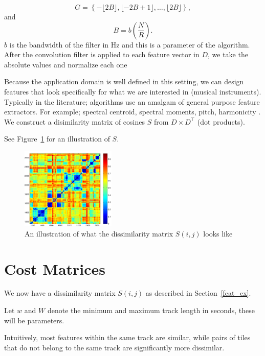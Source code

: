\documentclass[twocolumn]{article}
\begin{document}
$$G=\left\{-\lfloor 2B\rfloor,\lfloor-2B+1\rfloor,\ldots, \lfloor 2 B \rfloor\right\},$$ and $$B = b \left( \frac{N}{R} \right).$$ $b$ is the bandwidth of the filter in Hz and this is a parameter of the algorithm. After the convolution filter is applied to each feature vector in $D$, we take the absolute values and normalize each one 

Because the application domain is well defined in this setting, we can design features that look specifically for what we are interested in (musical instruments). Typically in the literature; algorithms use an amalgam of general purpose feature extractors. For example; spectral centroid, spectral moments, pitch, harmonicity \cite{tzanetakis1999framework}. We construct a disimilarity matrix of cosines $S$ from $D \times D^\top$ (dot products).

See Figure~\ref{fig:simmatrix} for an illustration of $S$.

\begin{figure}[t]
	\centering
	\includegraphics[width=0.4\textwidth]{images/simmat_plain}
	
	\caption{An illustration of what the dissimilarity matrix $S(i,j)$ looks like}
	\label{fig:simmatrix}
\end{figure} 

\section{Cost Matrices}\label{costmatrix_sec} %

We now have a dissimilarity matrix $S(i,j)$ as described in Section~\ref{feat_ex}. 

Let $w$ and $W$ denote the minimum and maximum track length in seconds, these will be parameters.

Intuitively, most features within the same track are similar, while pairs of tiles that do not belong to the same track are significantly more dissimilar. 
\end{document}

